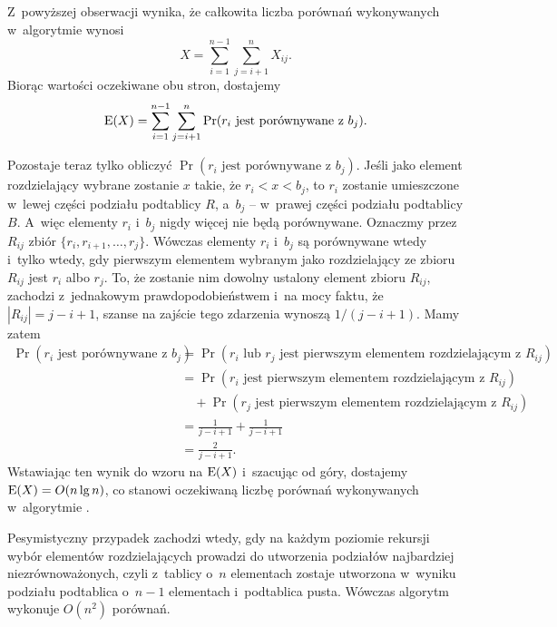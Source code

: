 Z~powyższej obserwacji wynika, że całkowita liczba porównań wykonywanych w~algorytmie wynosi
\[
    X = \sum_{i=1}^{n-1}\sum_{j=i+1}^nX_{ij}.
\]
Biorąc wartości oczekiwane obu stron, dostajemy
\[
    \operatorname{E}(X) = \sum_{i=1}^{n-1}\sum_{j=i+1}^n\Pr(\text{$r_i$ jest porównywane z~$b_j$}).
\]

Pozostaje teraz tylko obliczyć $\Pr(\text{$r_i$ jest porównywane z~$b_j$})$.
Jeśli jako element rozdzielający wybrane zostanie $x$ takie, że $r_i<x<b_j$, to $r_i$ zostanie umieszczone w~lewej części podziału podtablicy $R$, a~$b_j$ -- w~prawej części podziału podtablicy $B$.
A~więc elementy $r_i$ i~$b_j$ nigdy więcej nie będą porównywane.
Oznaczmy przez $R_{ij}$ zbiór $\{r_i,r_{i+1},\dots,r_j\}$.
Wówczas elementy $r_i$ i~$b_j$ są porównywane wtedy i~tylko wtedy, gdy pierwszym elementem wybranym jako rozdzielający ze zbioru $R_{ij}$ jest $r_i$ albo $r_j$.
To, że zostanie nim dowolny ustalony element zbioru $R_{ij}$, zachodzi z~jednakowym prawdopodobieństwem i~na mocy faktu, że $|R_{ij}|=j-i+1$, szanse na zajście tego zdarzenia wynoszą $1/(j-i+1)$.
Mamy zatem
\begin{align*}
    \Pr(\text{$r_i$ jest porównywane z~$b_j$}) &= \Pr(\text{$r_i$ lub $r_j$ jest pierwszym elementem rozdzielającym z~$R_{ij}$}) \\
	&= \Pr(\text{$r_i$ jest pierwszym elementem rozdzielającym z~$R_{ij}$}) \\
	&\quad {}+\Pr(\text{$r_j$ jest pierwszym elementem rozdzielającym z~$R_{ij}$}) \\
	&= \frac{1}{j-i+1}+\frac{1}{j-i+1} \\
	&= \frac{2}{j-i+1}.
\end{align*}
Wstawiając ten wynik do wzoru na $\operatorname{E}(X)$ i~szacując od góry, dostajemy $\operatorname{E}(X)=O(n\lg n)$, co stanowi oczekiwaną liczbę porównań wykonywanych w~algorytmie .

Pesymistyczny przypadek zachodzi wtedy, gdy na każdym poziomie rekursji wybór elementów rozdzielających prowadzi do utworzenia podziałów najbardziej niezrównoważonych, czyli z~tablicy o~$n$ elementach zostaje utworzona w~wyniku podziału podtablica o~$n-1$ elementach i~podtablica pusta.
Wówczas algorytm wykonuje $O(n^2)$ porównań.

